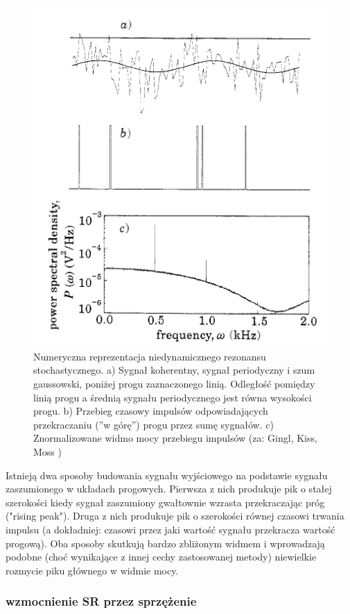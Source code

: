   \begin{figure}
    \includegraphics[scale=0.8]{images/gingl_1.png}
    \caption{Numeryczna reprezentacja niedynamicznego rezonansu stochastycznego. a) Sygnał koherentny, sygnał periodyczny i szum gaussowski, poniżej progu zaznaczonego linią. Odległość pomiędzy linią progu a średnią sygnału periodycznego jest równa wysokości progu. b) Przebieg czasowy impulsów odpowiadających przekraczaniu (''w górę'') progu przez sumę sygnałów. c) Znormalizowane widmo mocy przebiegu impulsów (za: Gingl, Kiss, Moss \cite{gingl_kiss_moss} )}
  \end{figure}

  Istnieją dwa sposoby budowania sygnału wyjściowego na podstawie sygnału zaszumionego w układach progowych. Pierwsza z nich produkuje pik o stałej szerokości kiedy sygnał zaszumiony gwałtownie wzrasta przekraczając próg ("rising peak"). Druga z nich produkuje pik o szerokości równej czasowi trwania impulsu (a dokładniej: czasowi przez jaki wartość sygnału przekracza wartość progową). Oba sposoby skutkują bardzo zbliżonym widmem i wprowadzają podobne (choć wynikające z innej cechy zastosowanej metody) niewielkie rozmycie piku głównego w widmie mocy.

  \subsubsection{wzmocnienie SR przez sprzężenie}

